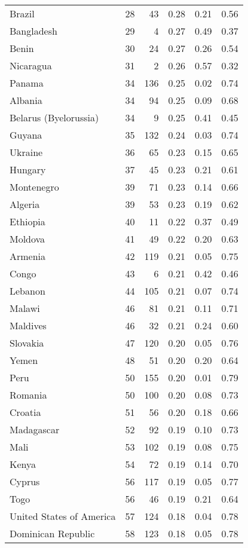 \begin{longtable}[t]{lrrrrr}
Brazil & 28 & 43 & 0.28 & 0.21 & 0.56\\
Bangladesh & 29 & 4 & 0.27 & 0.49 & 0.37\\
Benin & 30 & 24 & 0.27 & 0.26 & 0.54\\
\addlinespace
Nicaragua & 31 & 2 & 0.26 & 0.57 & 0.32\\
Panama & 34 & 136 & 0.25 & 0.02 & 0.74\\
Albania & 34 & 94 & 0.25 & 0.09 & 0.68\\
Belarus (Byelorussia) & 34 & 9 & 0.25 & 0.41 & 0.45\\
Guyana & 35 & 132 & 0.24 & 0.03 & 0.74\\
\addlinespace
Ukraine & 36 & 65 & 0.23 & 0.15 & 0.65\\
Hungary & 37 & 45 & 0.23 & 0.21 & 0.61\\
Montenegro & 39 & 71 & 0.23 & 0.14 & 0.66\\
Algeria & 39 & 53 & 0.23 & 0.19 & 0.62\\
Ethiopia & 40 & 11 & 0.22 & 0.37 & 0.49\\
\addlinespace
Moldova & 41 & 49 & 0.22 & 0.20 & 0.63\\
Armenia & 42 & 119 & 0.21 & 0.05 & 0.75\\
Congo & 43 & 6 & 0.21 & 0.42 & 0.46\\
Lebanon & 44 & 105 & 0.21 & 0.07 & 0.74\\
Malawi & 46 & 81 & 0.21 & 0.11 & 0.71\\
\addlinespace
Maldives & 46 & 32 & 0.21 & 0.24 & 0.60\\
Slovakia & 47 & 120 & 0.20 & 0.05 & 0.76\\
Yemen & 48 & 51 & 0.20 & 0.20 & 0.64\\
Peru & 50 & 155 & 0.20 & 0.01 & 0.79\\
Romania & 50 & 100 & 0.20 & 0.08 & 0.73\\
\addlinespace
Croatia & 51 & 56 & 0.20 & 0.18 & 0.66\\
Madagascar & 52 & 92 & 0.19 & 0.10 & 0.73\\
Mali & 53 & 102 & 0.19 & 0.08 & 0.75\\
Kenya & 54 & 72 & 0.19 & 0.14 & 0.70\\
Cyprus & 56 & 117 & 0.19 & 0.05 & 0.77\\
\addlinespace
Togo & 56 & 46 & 0.19 & 0.21 & 0.64\\
United States of America & 57 & 124 & 0.18 & 0.04 & 0.78\\
Dominican Republic & 58 & 123 & 0.18 & 0.05 & 0.78\\

\end{longtable}
